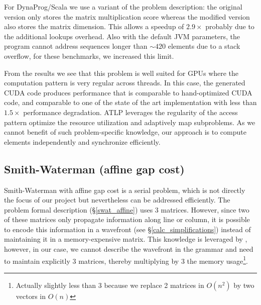 For DynaProg/Scala we use a variant of the problem description: the original version only stores the matrix multiplication score whereas the modified version also stores the matrix dimension. This allows a speedup of $2.9\times$ probably due to the additional lookups overhead. Also with the default JVM parameters, the program cannot address sequences longer than $\sim 420$ elements due to a stack overflow, for these benchmarks, we increased this limit.

From the results we see that this problem is well suited for GPUs where the computation pattern is very regular across threads. In this case, the generated CUDA code produces performance that is comparable to hand-optimized CUDA code, and comparable to one of the state of the art implementation with less than $1.5\times$ performance degradation. ATLP leverages the regularity of the access pattern optimize the resource utilization and adaptively map subproblems\cite{gpu_atlp}. As we cannot benefit of such problem-specific knowledge, our approach is to compute elements independently and synchronize efficiently.

\subsection{Smith-Waterman (affine gap cost)}
Smith-Waterman with affine gap cost is a serial problem, which is not directly the focus of our project but nevertheless can be addressed efficiently. The problem formal description (\S\ref{swat_affine}) uses 3 matrices. However, since two of these matrices only propagate information along line or column, it is possible to encode this information in a wavefront (see \S\ref{calc_simplifications}) instead of maintaining it in a memory-expensive matrix. This knowledge is leveraged by \cite{gpu_atlp}, however, in our case, we cannot describe the wavefront in the grammar and need to maintain explicitly 3 matrices, thereby multiplying by 3 the memory usage\footnote{Actually slightly less than 3 because we replace 2 matrices in $O(n^2)$ by two vectors in $O(n)$}.

